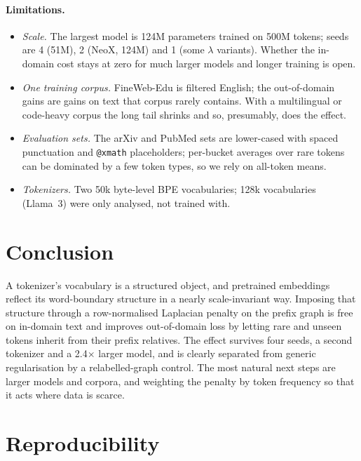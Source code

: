 \documentclass[11pt]{article}
\begin{document}
\paragraph{Limitations.}
\begin{itemize}
  \item \emph{Scale.} The largest model is 124M parameters trained on 500M tokens;
  seeds are 4 (51M), 2 (NeoX, 124M) and 1 (some $\lambda$ variants). Whether the
  in-domain cost stays at zero for much larger models and longer training is open.
  \item \emph{One training corpus.} FineWeb-Edu is filtered English; the
  out-of-domain gains are gains on text that corpus rarely contains. With a
  multilingual or code-heavy corpus the long tail shrinks and so, presumably, does
  the effect.
  \item \emph{Evaluation sets.} The arXiv and PubMed sets are lower-cased with
  spaced punctuation and \texttt{@xmath} placeholders; per-bucket averages over rare
  tokens can be dominated by a few token types, so we rely on all-token means.
  \item \emph{Tokenizers.} Two 50k byte-level BPE vocabularies; 128k vocabularies
  (Llama~3) were only analysed, not trained with.
\end{itemize}

\section{Conclusion}

A tokenizer's vocabulary is a structured object, and pretrained embeddings reflect
its word-boundary structure in a nearly scale-invariant way. Imposing that
structure through a row-normalised Laplacian penalty on the prefix graph is free on
in-domain text and improves out-of-domain loss by letting rare and unseen tokens
inherit from their prefix relatives. The effect survives four seeds, a second
tokenizer and a 2.4$\times$ larger model, and is clearly separated from generic
regularisation by a relabelled-graph control. The most natural next steps are larger
models and corpora, and weighting the penalty by token frequency so that it acts
where data is scarce.

\appendix
\section{Reproducibility}
\end{document}
